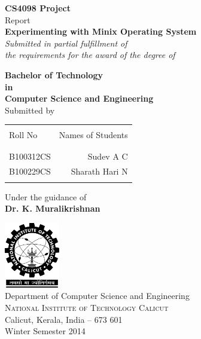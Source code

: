\begin{titlepage}

\begin{center}

\textup{\small {\bf CS4098 Project} \\ Report}\\[0.2in]

\Large \textbf {Experimenting with Minix Operating System}\\[0.5in]

       \small \emph{Submitted in partial fulfillment of\\
        the requirements for the award of the degree of}
        \vspace{.2in}

       {\bf Bachelor of Technology \\in\\ Computer Science and Engineering}\\[0.5in]

\normalsize Submitted by \\
\begin{table}[h]
\centering
\begin{tabular}{lr}\hline \\
Roll No & Names of Students \\ \\ \hline
\\
B100312CS & Sudev A C \\
B100229CS & Sharath Hari N \\ 
 \\ \hline 
\end{tabular}
\end{table}

\vspace{.1in}
Under the guidance of\\
{\textbf{Dr. K. Muralikrishnan}}\\[0.2in]

\vfill

\includegraphics[width=0.18\textwidth]{./nitc-logo}\\[0.1in]
\Large{Department of Computer Science and Engineering}\\
\normalsize
\textsc{National Institute of Technology Calicut}\\
Calicut, Kerala, India -- 673 601 \\
\vspace{0.2cm}
Winter Semester 2014

\end{center}

\end{titlepage}
